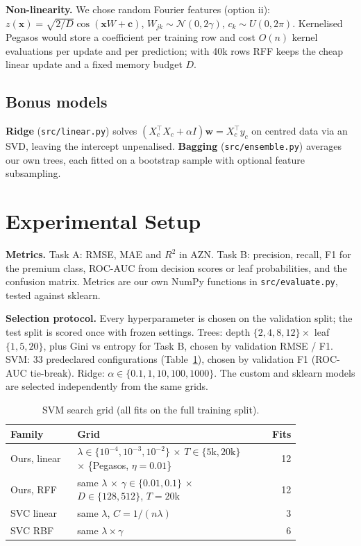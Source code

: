 \documentclass[10pt,twocolumn,a4paper]{article}
\begin{document}
\textbf{Non-linearity.} We chose random Fourier features (option ii):
$z(\mathbf{x})=\sqrt{2/D}\cos(\mathbf{x}W+\mathbf{c})$,
$W_{jk}\sim\mathcal N(0,2\gamma)$, $c_k\sim U(0,2\pi)$. Kernelised Pegasos
would store a coefficient per training row and cost $O(n)$ kernel
evaluations per update and per prediction; with 40k rows RFF keeps the
cheap linear update and a fixed memory budget $D$.

\subsection{Bonus models}
\textbf{Ridge} (\texttt{src/linear.py}) solves
$(X_c^\top X_c+\alpha I)\mathbf{w}=X_c^\top y_c$ on centred data via an SVD,
leaving the intercept unpenalised. \textbf{Bagging}
(\texttt{src/ensemble.py}) averages our own trees, each fitted on a bootstrap
sample with optional feature subsampling.

\section{Experimental Setup}
\textbf{Metrics.} Task A: RMSE, MAE and $R^2$ in AZN. Task B: precision,
recall, F1 for the premium class, ROC-AUC from decision scores or leaf
probabilities, and the confusion matrix. Metrics are our own NumPy functions
in \texttt{src/evaluate.py}, tested against sklearn.

\textbf{Selection protocol.} Every hyperparameter is chosen on the
validation split; the test split is scored once with frozen settings.
Trees: depth $\{2,4,8,12\}\times$ leaf $\{1,5,20\}$, plus Gini vs entropy for
Task B, chosen by validation RMSE / F1. SVM: 33 predeclared configurations
(Table~\ref{tab:svmgrid}), chosen by validation F1 (ROC-AUC tie-break).
Ridge: $\alpha\in\{0.1,1,10,100,1000\}$. The custom and sklearn models are
selected independently from the same grids.

\begin{table}[t]
  \centering\small
  \caption{SVM search grid (all fits on the full training split).}
  \label{tab:svmgrid}
  \begin{tabular}{@{}p{0.23\linewidth}p{0.6\linewidth}r@{}}
    \toprule
    Family & Grid & Fits \\
    \midrule
    Ours, linear & $\lambda\in\{10^{-4},10^{-3},10^{-2}\}$ $\times$ $T\in\{5\text{k},20\text{k}\}$ $\times$ \{Pegasos, $\eta{=}0.01$\} & 12\\
    Ours, RFF & same $\lambda$ $\times$ $\gamma\in\{0.01,0.1\}$ $\times$ $D\in\{128,512\}$, $T{=}20$k & 12 \\
    SVC linear & same $\lambda$, $C=1/(n\lambda)$ & 3 \\
    SVC RBF & same $\lambda\times\gamma$ & 6 \\
    \bottomrule
  \end{tabular}
\end{table}
\end{document}
